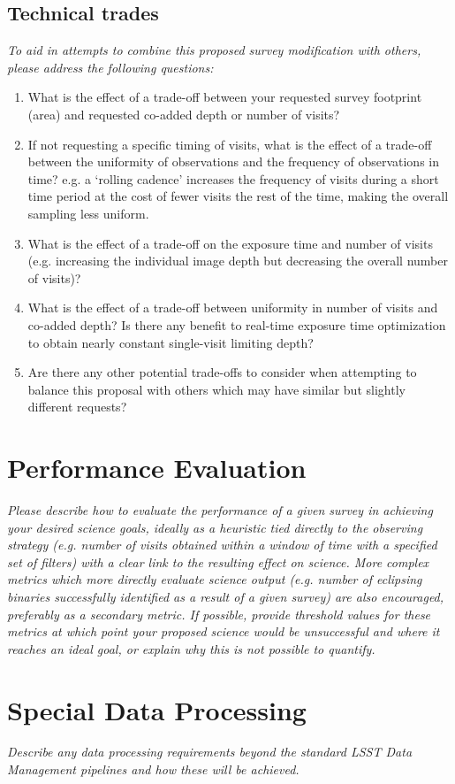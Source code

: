 \documentclass[11pt]{article}
\begin{document}
\subsection{Technical trades}
\begin{footnotesize}
{\it To aid in attempts to combine this proposed survey modification with others, please address the following questions:
\begin{enumerate}
    \item What is the effect of a trade-off between your requested survey footprint (area) and requested co-added depth or number of visits?
    \item If not requesting a specific timing of visits, what is the effect of a trade-off between the uniformity of observations and the frequency of observations in time? e.g. a `rolling cadence' increases the frequency of visits during a short time period at the cost of fewer visits the rest of the time, making the overall sampling less uniform.
    \item What is the effect of a trade-off on the exposure time and number of visits (e.g. increasing the individual image depth but decreasing the overall number of visits)?
    \item What is the effect of a trade-off between uniformity in number of visits and co-added depth? Is there any benefit to real-time exposure time optimization to obtain nearly constant single-visit limiting depth?
    \item Are there any other potential trade-offs to consider when attempting to balance this proposal with others which may have similar but slightly different requests?
\end{enumerate}}
\end{footnotesize}

\section{Performance Evaluation}
\begin{footnotesize}
{\it Please describe how to evaluate the performance of a given survey in achieving your desired
science goals, ideally as a heuristic tied directly to the observing strategy (e.g. number of visits obtained
within a window of time with a specified set of filters) with a clear link to the resulting effect on science.
More complex metrics which more directly evaluate science output (e.g. number of eclipsing binaries successfully
identified as a result of a given survey) are also encouraged, preferably as a secondary metric.
If possible, provide threshold values for these metrics at which point your proposed science would be unsuccessful 
and where it reaches an ideal goal, or explain why this is not possible to quantify.}
\end{footnotesize}

\vspace{.6in}

\section{Special Data Processing}
\begin{footnotesize}
{\it Describe any data processing requirements beyond the standard LSST Data Management pipelines and how these will be achieved.}
\end{footnotesize}
\end{document}
